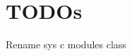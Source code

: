 \chapter{TODOs}
\hypertarget{md__s_1_2code_2_q_t___v_h_d_l__simulator_2code_2_qt___v_h_d_l___s_v_g__proj_2_t_o_d_os}{}\label{md__s_1_2code_2_q_t___v_h_d_l__simulator_2code_2_qt___v_h_d_l___s_v_g__proj_2_t_o_d_os}

\begin{DoxyItemize}
\item Rename sys c modules class 
\end{DoxyItemize}
